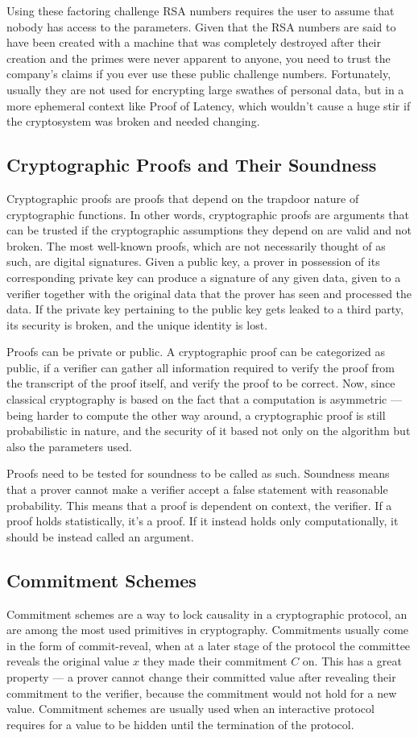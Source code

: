 Using these factoring challenge RSA numbers requires the user to assume that nobody has access to the parameters. Given that the RSA numbers are said to have been created with a machine that was completely destroyed after their creation and the primes were never apparent to anyone, you need to trust the company's claims if you ever use these public challenge numbers. Fortunately, usually they are not used for encrypting large swathes of personal data, but in a more ephemeral context like Proof of Latency, which wouldn't cause a huge stir if the cryptosystem was broken and needed changing.

\subsection{Cryptographic Proofs and Their Soundness}
Cryptographic proofs are proofs that depend on the trapdoor nature of cryptographic functions. In other words, cryptographic proofs are arguments that can be trusted if the cryptographic assumptions they depend on are valid and not broken. The most well-known proofs, which are not necessarily thought of as such, are digital signatures. Given a public key, a prover in possession of its corresponding private key can produce a signature of any given data, given to a verifier together with the original data that the prover has seen and processed the data. If the private key pertaining to the public key gets leaked to a third party, its security is broken, and the unique identity is lost.

Proofs can be private or public. A cryptographic proof can be categorized as public, if a verifier can gather all information required to verify the proof from the transcript of the proof itself, and verify the proof to be correct. Now, since classical cryptography is based on the fact that a computation is asymmetric --- being harder to compute the other way around, a cryptographic proof is still probabilistic in nature, and the security of it based not only on the algorithm but also the parameters used.

Proofs need to be tested for soundness to be called as such. Soundness means that a prover cannot make a verifier accept a false statement with reasonable probability. This means that a proof is dependent on context, the verifier. If a proof holds statistically, it's a proof. If it instead holds only computationally, it should be instead called an argument.


\subsection{Commitment Schemes}
Commitment schemes are a way to lock causality in a cryptographic protocol, an are among the most used primitives in cryptography. Commitments usually come in the form of commit-reveal, when at a later stage of the protocol the committee reveals the original value \(x\) they made their commitment \(C\) on. This has a great property --- a prover cannot change their committed value after revealing their commitment to the verifier, because the commitment would not hold for a new value. Commitment schemes are usually used when an interactive protocol requires for a value to be hidden until the termination of the protocol.

